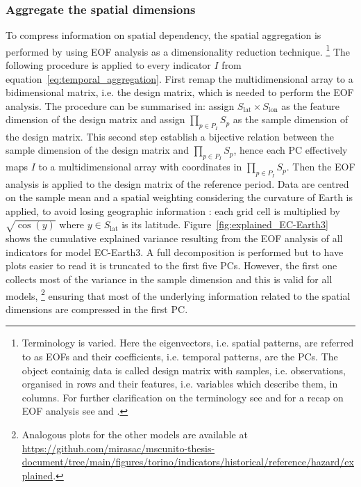 \subsubsection{Aggregate the spatial dimensions}
To compress information on spatial dependency, the spatial aggregation is performed by using \gls{EOF} analysis as a dimensionality reduction technique.%
\footnote{Terminology is varied. Here the eigenvectors, i.e. spatial patterns, are referred to as \glspl{EOF} and their coefficients, i.e. temporal patterns, are the \glspl{PC}. The object containig data is called design matrix with samples, i.e. observations, organised in rows and their features, i.e. variables which describe them, in columns. For further clarification on the terminology see \cite[626-627]{2019WilksStatisticalMethods} and for a recap on \gls{EOF} analysis see \cite[6502-6503]{2009MonahanEmpiricalOrthogonal} and \cite[1121-1122]{2007HannachiEmpiricalOrthogonal}.}
The following procedure is applied to every \gls{indicator} $I$ from equation~\eqref{eq:temporal_aggregation}.
First remap the multidimensional array to a bidimensional matrix, i.e. the design matrix, which is needed to perform the \gls{EOF} analysis. The procedure can be summarised in: assign $S_\text{lat} \times S_\text{lon}$ as the feature dimension of the design matrix and assign $\prod_{p \in P_I} S_p$ as the sample dimension of the design matrix. This second step establish a bijective relation between the sample dimension of the design matrix and $\prod_{p \in P_I} S_p$, hence each \gls{PC} effectively maps $I$ to a multidimensional array with coordinates in $\prod_{p \in P_I} S_p$.
Then the \gls{EOF} analysis is applied to the design matrix of the reference period. Data are centred on the sample mean and a spatial weighting considering the curvature of Earth is applied, to avoid losing geographic information \cite{2009BaldwinSpatialWeighting}: each grid cell is multiplied by $\sqrt{\cos{(y)}}$ where $y \in S_\text{lat}$ is its latitude.
Figure~\ref{fig:explained_EC-Earth3} shows the cumulative explained variance resulting from the \gls{EOF} analysis of all indicators for model EC-Earth3. A full decomposition is performed but to have plots easier to read it is truncated to the first five \glspl{PC}. However, the first one collects most of the variance in the sample dimension and this is valid for all models,%
\footnote{Analogous plots for the other models are available at \url{https://github.com/mirasac/mscunito-thesis-document/tree/main/figures/torino/indicators/historical/reference/hazard/explained}.}
ensuring that most of the underlying information related to the spatial dimensions are compressed in the first \gls{PC}.

